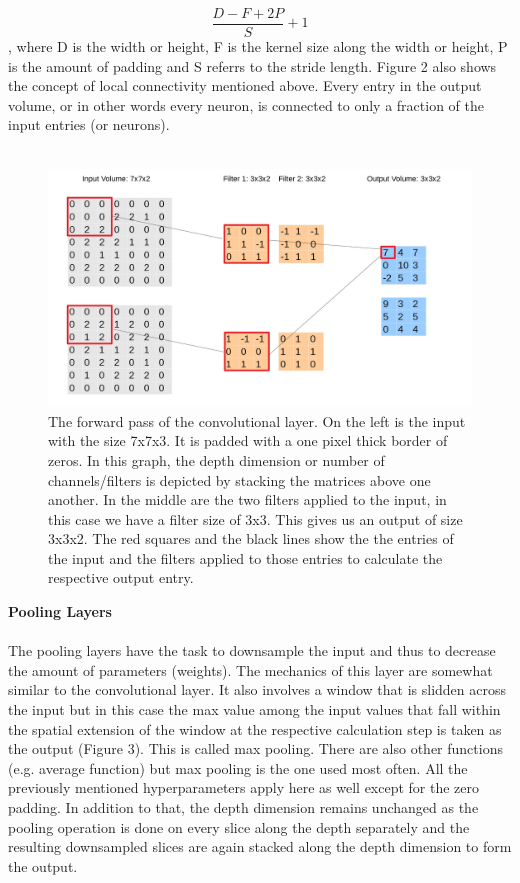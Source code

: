 \documentclass{article}
\begin{document}
\[
\frac{D-F+2P}{S}+1
\]
, where D is the width or height, F is the kernel size along the width or height, P is the amount of padding and S referrs to the stride length. Figure 2 also shows the concept of local connectivity mentioned above. Every entry in the output volume, or in other words every neuron, is connected to only a fraction of the input entries (or neurons).\\\\
\begin{figure}[H]
\begin{center}
\includegraphics[scale=0.25]{CNN_forward}
\end{center}
\caption{The forward pass of the convolutional layer. On the left is the input with the size 7x7x3. It is padded with a one pixel thick border of zeros. In this graph, the depth dimension or number of channels/filters is depicted by stacking the matrices above one another. In the middle are the two filters applied to the input, in this case we have a filter size of 3x3. This gives us an output of size 3x3x2. The red squares and the black lines show the the entries of the input and the filters applied to those entries to calculate the respective output entry. }
\end{figure}
\textbf{Pooling Layers}\\\\
The pooling layers have the task to downsample the input and thus to decrease the amount of parameters (weights). The mechanics of this layer are somewhat similar to the convolutional layer. It also involves a window that is slidden across the input but in this case the max value among the input values that fall within the spatial extension of the window at the respective calculation step is taken as the output (Figure 3). This is called max pooling. There are also other functions (e.g. average function) but max pooling is the one used most often. All the previously mentioned hyperparameters apply here as well except for the zero padding. In addition to that, the depth dimension remains unchanged as the pooling operation is done on every slice along the depth separately and the resulting downsampled slices are again stacked along the depth dimension to form the output.
\end{document}
